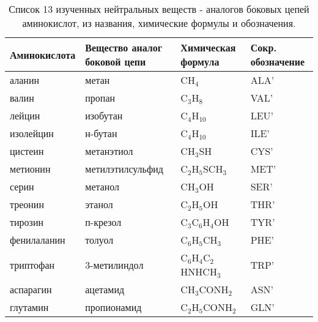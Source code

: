 \begin{table*}[p]

	\begin{tabularx}{\textwidth}{XXXX}
Аминокислота & Вещество аналог боковой цепи & Химическая формула & Сокр. обозначение \\
	\hline

аланин       & метан   					  & CH$_4$      						 &  ALA'  \\
валин     & пропан					    & C$_3$H$_8$ 							 &  VAL'  \\
лейцин & изобутан 					  & C$_4$H$_{10}$			 			 &  LEU'  \\
изолейцин    & н-бутан     					& C$_4$H$_{10}$						 &  ILE'  \\
цистеин   & метанэтиол 					& CH$_3$SH    						 &  CYS'  \\
метионин    & метилэтилсульфид  & C$_2$H$_5$SCH$_3$  			 &  MET'  \\
серин       & метанол				& CH$_3$OH        			   &  SER'  \\
треонин     & этанол								& C$_2$H$_5$OH      			 &  THR'  \\
тирозин& п-крезол						& C$_3$C$_6$H$_4$OH		 	   &  TYR'  \\
фенилаланин & толуол								& C$_6$H$_5$CH$_3$   			 &  PHE'  \\
триптофан    & 3-метилиндол 				& C$_6$H$_4$C$_2$HNHCH$_3$ &  TRP'  \\
аспарагин    & ацетамид					& CH$_3$CONH$_2$					 &  ASN'  \\
глутамин     & пропионамид					& C$_2$H$_5$CONH$_2$       &  GLN'  \\
\end{tabularx}
	
	\caption{Список 13 изученных нейтральных веществ - аналогов боковых цепей аминокислот, из названия, химические формулы и обозначения.}
	\label{molecules}

\end{table*}